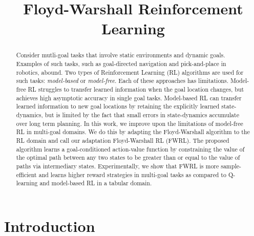\documentclass[letterpaper]{article} %
\title{Floyd-Warshall Reinforcement Learning}
\begin{document}
\maketitle
\begin{abstract}
Consider mutli-goal tasks that involve static environments and dynamic
goals. Examples of such tasks, such as goal-directed navigation
and pick-and-place in robotics, abound.
Two types of Reinforcement Learning (RL) algorithms are used for
such tasks: 
\emph{model-based} or \emph{model-free}. Each of these approaches has limitations.
Model-free RL struggles to transfer learned information when the goal location
changes, but achieves high asymptotic accuracy in single goal tasks. Model-based
RL can transfer learned information to new goal locations by retaining the
explicitly learned state-dynamics, but is limited by the fact that small errors in
state-dynamics accumulate over long term planning.
In this work, we improve upon the limitations of model-free RL in
multi-goal domains. 
We do this by adapting the Floyd-Warshall algorithm to
the RL domain and call our adaptation Floyd-Warshall RL (FWRL).
The proposed algorithm learns a goal-conditioned action-value function by 
constraining the value of the
optimal path between any two states to be greater than or equal to the value of
paths via intermediary states.
Experimentally, we show that FWRL is more sample-efficient and learns higher reward strategies in
multi-goal tasks as compared to Q-learning and model-based RL in a
tabular domain.



\end{abstract}


\section{ Introduction}



%








\end{document}
